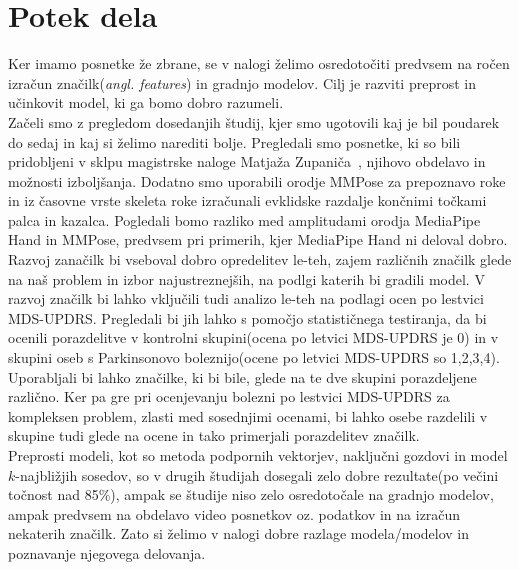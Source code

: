 \documentclass[a4paper,12pt]{article}
\begin{document}
\section{Potek dela}
Ker imamo posnetke že zbrane, se v nalogi želimo osredotočiti predvsem na ročen izračun značilk(\textit{angl. features}) 
in gradnjo modelov. Cilj je razviti preprost in učinkovit model, ki ga bomo dobro razumeli. \\

Začeli smo z pregledom dosedanjih študij, kjer smo ugotovili kaj je bil poudarek do sedaj in kaj si želimo 
narediti bolje. Pregledali smo posnetke, ki so bili pridobljeni v sklpu magistrske naloge Matjaža 
Zupaniča~\cite{Zupanic}, njihovo obdelavo in možnosti izboljšanja. Dodatno smo uporabili orodje 
MMPose za prepoznavo roke in iz časovne vrste skeleta roke izračunali evklidske razdalje končnimi 
točkami palca in kazalca. Pogledali bomo razliko med amplitudami orodja MediaPipe Hand in MMPose, 
predvsem pri primerih, kjer MediaPipe Hand ni deloval dobro. \\

Razvoj zanačilk bi vseboval dobro opredelitev le-teh, zajem različnih značilk glede na naš problem in 
izbor najustreznejših, na podlgi katerih bi gradili model. V razvoj značilk bi lahko vključili tudi analizo 
le-teh na podlagi ocen po lestvici MDS-UPDRS. Pregledali bi jih lahko s pomočjo statističnega testiranja, 
da bi ocenili porazdelitve v kontrolni skupini(ocena po letvici MDS-UPDRS je 0) in v skupini oseb s 
Parkinsonovo boleznijo(ocene po letvici MDS-UPDRS so 1,2,3,4). Uporabljali bi lahko značilke, ki bi bile, 
glede na te dve skupini porazdeljene različno. Ker pa gre pri ocenjevanju bolezni po lestvici MDS-UPDRS za 
kompleksen problem, zlasti med sosednjimi ocenami, bi lahko osebe razdelili v skupine tudi glede na ocene in 
tako primerjali porazdelitev značilk. \\

Preprosti modeli, kot so metoda podpornih vektorjev, naključni gozdovi in model $k$-najbližjih sosedov, so 
v drugih študijah dosegali zelo dobre rezultate(po večini točnost nad 85\%), ampak se študije niso zelo 
osredotočale na gradnjo modelov, ampak predvsem na obdelavo video posnetkov oz. podatkov in na izračun 
nekaterih značilk. Zato si želimo v nalogi dobre razlage modela/modelov in poznavanje njegovega delovanja.

\newpage
\printbibliography
\end{document}
